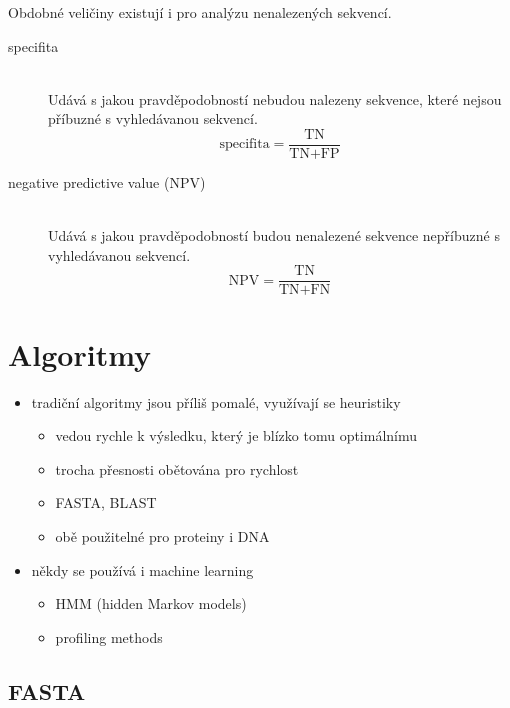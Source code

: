 \documentclass[DIV=8]{scrreprt}
\begin{document}
Obdobné veličiny existují i pro analýzu nenalezených sekvencí.

\begin{description}
\item[specifita]\hfill \\
Udává s jakou pravděpodobností nebudou nalezeny sekvence, které nejsou příbuzné s vyhledávanou sekvencí.
\[\text{specifita} = \frac{\text{TN}}{\text{TN} + \text{FP}}\]


\item[negative predictive value (NPV)]\hfill \\
Udává s jakou pravděpodobností budou nenalezené sekvence nepříbuzné s vyhledávanou sekvencí.
\[\text{NPV} = \frac{\text{TN}}{\text{TN} + \text{FN}}\]

\end{description}


\section{Algoritmy} \label{Algoritmy}


\begin{itemize}[nosep]
    \item tradiční algoritmy jsou příliš pomalé, využívají se heuristiky
\begin{itemize}[nosep]
    \item vedou rychle k výsledku, který je blízko tomu optimálnímu
    \item trocha přesnosti obětována pro rychlost
    \item FASTA, BLAST
    \item obě použitelné pro proteiny i DNA
\end{itemize}

    \item někdy se používá i machine learning
\begin{itemize}[nosep]
    \item HMM (hidden Markov models)
    \item profiling methods
\end{itemize}

\end{itemize}



\subsection{FASTA} \label{FASTA}
\end{document}
